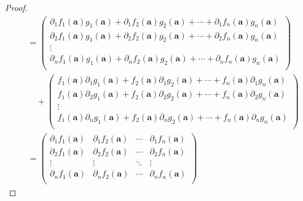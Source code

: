 \documentclass[dvipdfmx]{jsarticle}
\begin{document}
\begin{proof}
\begin{align*}
&= \begin{pmatrix}
\partial_{1}f_{1}\left( \mathbf{a} \right)g_{1}\left( \mathbf{a} \right) + \partial_{1}f_{2}\left( \mathbf{a} \right)g_{2}\left( \mathbf{a} \right) + \cdots + \partial_{1}f_{n}\left( \mathbf{a} \right)g_{n}\left( \mathbf{a} \right) \\
\partial_{2}f_{1}\left( \mathbf{a} \right)g_{1}\left( \mathbf{a} \right) + \partial_{2}f_{2}\left( \mathbf{a} \right)g_{2}\left( \mathbf{a} \right) + \cdots + \partial_{2}f_{n}\left( \mathbf{a} \right)g_{n}\left( \mathbf{a} \right) \\
 \vdots \\
\partial_{n}f_{1}\left( \mathbf{a} \right)g_{1}\left( \mathbf{a} \right) + \partial_{n}f_{2}\left( \mathbf{a} \right)g_{2}\left( \mathbf{a} \right) + \cdots + \partial_{n}f_{n}\left( \mathbf{a} \right)g_{n}\left( \mathbf{a} \right) \\
\end{pmatrix} \\
&\quad + \begin{pmatrix}
f_{1}\left( \mathbf{a} \right)\partial_{1}g_{1}\left( \mathbf{a} \right) + f_{2}\left( \mathbf{a} \right)\partial_{1}g_{2}\left( \mathbf{a} \right) + \cdots + f_{n}\left( \mathbf{a} \right)\partial_{1}g_{n}\left( \mathbf{a} \right) \\
f_{1}\left( \mathbf{a} \right)\partial_{2}g_{1}\left( \mathbf{a} \right) + f_{2}\left( \mathbf{a} \right)\partial_{2}g_{2}\left( \mathbf{a} \right) + \cdots + f_{n}\left( \mathbf{a} \right)\partial_{2}g_{n}\left( \mathbf{a} \right) \\
 \vdots \\
f_{1}\left( \mathbf{a} \right)\partial_{n}g_{1}\left( \mathbf{a} \right) + f_{2}\left( \mathbf{a} \right)\partial_{n}g_{2}\left( \mathbf{a} \right) + \cdots + f_{n}\left( \mathbf{a} \right)\partial_{n}g_{n}\left( \mathbf{a} \right) \\
\end{pmatrix}\\
&= \begin{pmatrix}
\partial_{1}f_{1}\left( \mathbf{a} \right) & \partial_{1}f_{2}\left( \mathbf{a} \right) & \cdots & \partial_{1}f_{n}\left( \mathbf{a} \right) \\
\partial_{2}f_{1}\left( \mathbf{a} \right) & \partial_{2}f_{2}\left( \mathbf{a} \right) & \cdots & \partial_{2}f_{n}\left( \mathbf{a} \right) \\
 \vdots & \vdots & \ddots & \vdots \\
\partial_{n}f_{1}\left( \mathbf{a} \right) & \partial_{n}f_{2}\left( \mathbf{a} \right) & \cdots & \partial_{n}f_{n}\left( \mathbf{a} \right) \\

\end{pmatrix}
\end{align*}
\end{proof}
\end{document}
